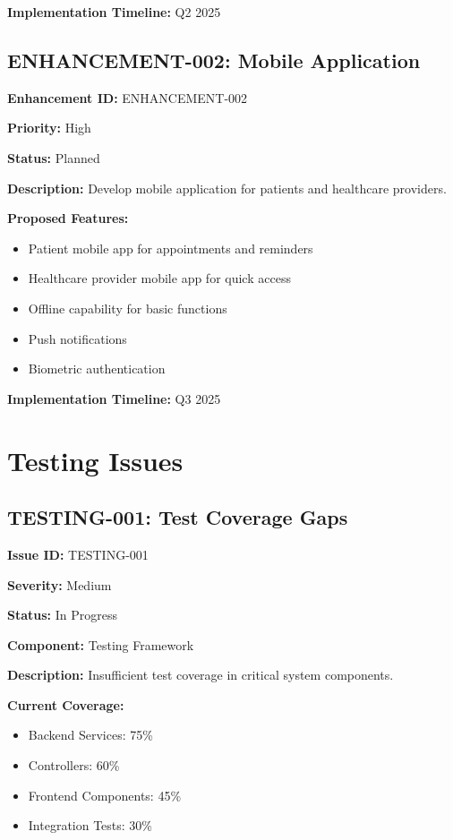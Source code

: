 \documentclass[12pt,a4paper]{article}
\begin{document}
\textbf{Implementation Timeline:} Q2 2025

\subsection{ENHANCEMENT-002: Mobile Application}

\textbf{Enhancement ID:} ENHANCEMENT-002

\textbf{Priority:} High

\textbf{Status:} Planned

\textbf{Description:} Develop mobile application for patients and healthcare providers.

\textbf{Proposed Features:}
\begin{itemize}
    \item Patient mobile app for appointments and reminders
    \item Healthcare provider mobile app for quick access
    \item Offline capability for basic functions
    \item Push notifications
    \item Biometric authentication
\end{itemize}

\textbf{Implementation Timeline:} Q3 2025

\section{Testing Issues}

\subsection{TESTING-001: Test Coverage Gaps}

\textbf{Issue ID:} TESTING-001

\textbf{Severity:} Medium

\textbf{Status:} In Progress

\textbf{Component:} Testing Framework

\textbf{Description:} Insufficient test coverage in critical system components.

\textbf{Current Coverage:}
\begin{itemize}
    \item Backend Services: 75\%
    \item Controllers: 60\%
    \item Frontend Components: 45\%
    \item Integration Tests: 30\%
\end{itemize}
\end{document}
